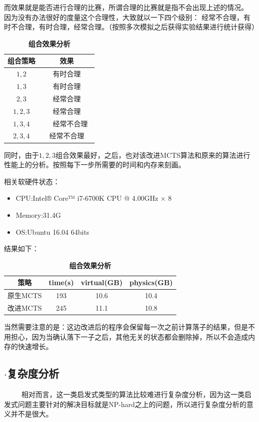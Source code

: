 \documentclass[9pt,twocolumn,twoside]{osajnl}
\begin{document}
\begin{adjustwidth}{2em}{}
而效果就是能否进行合理的比赛，所谓合理的比赛就是指不会出现上述的情况。
因为没有办法很好的度量这个合理性，大致就以一下四个级别：
经常不合理，有时不合理，有时合理，经常合理。（按照多次模拟之后获得实验结果进行统计获得）
\begin{table}[htbp]
	\centering
	\caption{\bf 组合效果分析}
	\begin{tabular}{cc}
		\hline
		组合策略 & 效果  \\
		\hline
		$1,2$ & 有时合理 \\
		$1,3$ & 有时合理 \\
		$2,3$ & 经常合理 \\
		$1,2,3$ & 经常合理 \\
		$1,3,4$ &　经常不合理　\\
		$2,3,4$ & 经常不合理 \\
		\hline
	\end{tabular}
	\label{tab:result1}
\end{table}

同时，由于$1,2,3$组合效果最好，之后，也对该改进MCTS算法和原来的算法进行性能上的分析。按照每下一步所需要的时间和内存来刻画。

相关软硬件状态：
\begin{itemize}
	\item CPU:Intel® Core™ i7-6700K CPU @ 4.00GHz × 8 
	\item Memory:31.4G
	\item OS:Ubuntu 16.04 64bits
\end{itemize}

结果如下：

\begin{table}[htbp]
	\centering
	\caption{\bf 组合效果分析}
	\begin{tabular}{cccc}
		\hline
		策略 & time(s) & virtual(GB) & physics(GB) \\
		\hline
		原生MCTS & 193 & 10.6 & 10.4 \\
		改进MCTS & 245 & 11.1 & 10.8 \\
		\hline
	\end{tabular}
	\label{tab:result2}
\end{table}

当然需要注意的是：这边改进后的程序会保留每一次之前计算落子的结果，但是不用担心，因为当确认落下一子之后，其他无关的状态都会删除掉，所以不会造成内存的快速增长。
\end{adjustwidth}

\subsection{$\cdot$复杂度分析}
\begin{adjustwidth}{2em}{}	
	\ \ \ \ \
	相对而言，这一类启发式类型的算法比较难进行复杂度分析，因为这一类启发式问题主要针对的解决目标就是NP-hard之上的问题，所以进行复杂度分析的意义并不是很大。	
\end{adjustwidth}
\end{document}
